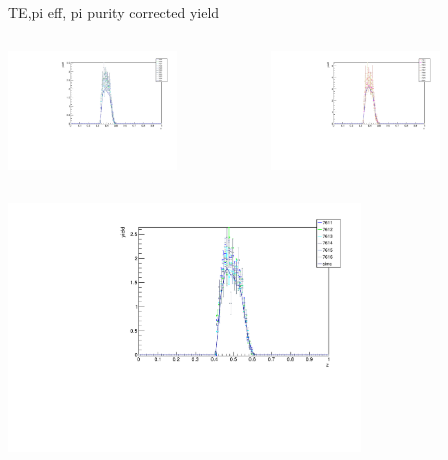 \begin{frame}{TE,pi eff, pi purity corrected yield}
\begin{columns}
\begin{column}[T]{0.5\textwidth}
\includegraphics[width = 0.7\textwidth]{results/yield/check/yieldcheck_450_neg.pdf}
\end{column}
\begin{column}[T]{0.5\textwidth}
\includegraphics[width = 0.7\textwidth]{results/yield/check/yieldcheck_450_pos.pdf}
\end{column}
\end{columns}
\begin{columns}
\begin{column}[T]{0.5\textwidth}
\includegraphics[width = 0.7\textwidth]{results/yield/check/yieldcheck_440_neg.pdf}

\end{column}
\end{columns}
\end{frame}
